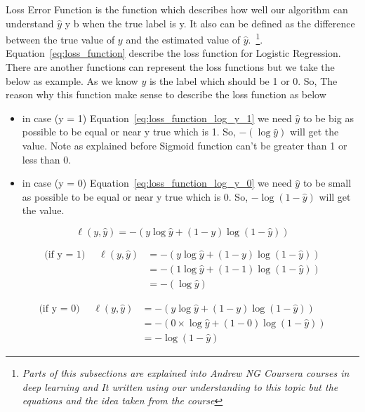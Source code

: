 Loss Error Function is the function which describes how well our algorithm can understand  $\widehat{y}$ y b when the true label is y. It also can be defined as the difference between the true value of $y$ and the estimated value of  $\widehat{y}$.~\footnote{\textit{Parts of this subsections are explained into Andrew NG Coursera courses in deep learning and It written using our understanding to this topic but the equations and the idea taken from the course}}. Equation~\eqref{eq:loss_function} describe the loss function for Logistic Regression. There are another functions can represent the loss functions but we take the below as example. As we know $y$ is the label which should be 1 or 0. So, The reason why this function make sense to describe the loss function as below
\begin{itemize}
\item in case (y = 1) Equation~\eqref{eq:loss_function_log_y_1} we need $\widehat{y}$ to be big as possible to be equal or near y true which is 1. So, $ - (\log \widehat{y} )$ will get the value. Note as explained before Sigmoid function can't be greater than 1 or less than 0. %
\item in case (y = 0) Equation~\eqref{eq:loss_function_log_y_0} we need $\widehat{y}$ to be small as possible to be equal or near y true which is 0. So, $- \log (1-\widehat{y})$  will get the value.  %
  \end{itemize}
  
\begin{equation}
  \label{eq:loss_function}
    \ell(y,\widehat{y}) = - (y \log \widehat{y} + (1-y) \log (1-\widehat{y}))
  \end{equation}

\begin{equation} \label{eq:loss_function_log_y_1}
\begin{split}
  \text{(if y = 1) } \quad  \ell(y,\widehat{y}) & = - (y \log \widehat{y} + (1-y) \log (1-\widehat{y})) \\
  & = - (1 \log \widehat{y} + (1-1) \log (1-\widehat{y}))\\
  & = - (\log \widehat{y} )
\end{split}
\end{equation}


\begin{equation} \label{eq:loss_function_log_y_0}
\begin{split}
  \text{(if y = 0) } \quad  \ell(y,\widehat{y}) & = - (y \log \widehat{y} + (1-y) \log (1-\widehat{y})) \\
  & = - (0 \times \log \widehat{y} + (1-0) \log (1-\widehat{y}))\\
  & = - \log (1-\widehat{y})
\end{split}
\end{equation}




